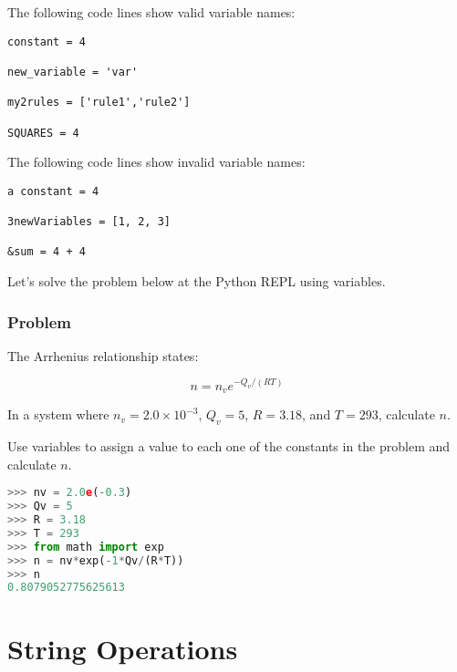\documentclass{book}
\begin{document}
    
        The following code lines show valid variable names:
    




    
        \begin{lstlisting}
constant = 4

new_variable = 'var'

my2rules = ['rule1','rule2']

SQUARES = 4
\end{lstlisting}
    




    
        The following code lines show invalid variable names:
    




    
        \begin{lstlisting}
a constant = 4

3newVariables = [1, 2, 3]

&sum = 4 + 4
\end{lstlisting}
    




    
        Let's solve the problem below at the Python REPL using variables.

\hypertarget{problem}{%
\subsubsection{Problem}\label{problem}}

The Arrhenius relationship states:

\[ n = n_{v}e^{-Q_v/(RT)} \]

In a system where \(n_v = 2.0 \times 10^{-3}\), \(Q_v = 5\), \(R=3.18\),
and \(T=293\), calculate \(n\).

Use variables to assign a value to each one of the constants in the
problem and calculate \(n\).

\begin{lstlisting}[language=Python]
>>> nv = 2.0e(-0.3)
>>> Qv = 5
>>> R = 3.18
>>> T = 293
>>> from math import exp
>>> n = nv*exp(-1*Qv/(R*T))
>>> n
0.8079052775625613
\end{lstlisting}
    




    
        \hypertarget{string-operations}{%
\section{String Operations}\label{string-operations}}
    
\end{document}
